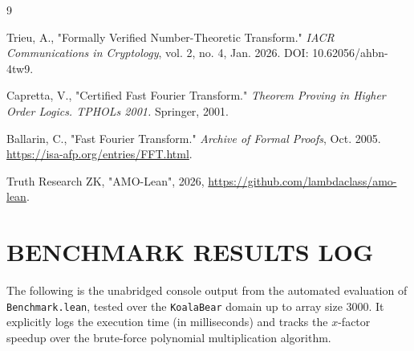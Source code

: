 \documentclass[a4paper,12pt]{report}
\begin{document}


\newpage

\renewcommand{\bibname}{REFERENCES} %
\begin{thebibliography}{9}

Trieu, A., "Formally Verified Number-Theoretic Transform." \textit{IACR Communications in Cryptology}, vol. 2, no. 4, Jan. 2026. DOI: 10.62056/ahbn-4tw9.

Capretta, V., "Certified Fast Fourier Transform." \textit{Theorem Proving in Higher Order Logics. TPHOLs 2001.} Springer, 2001.

Ballarin, C., "Fast Fourier Transform." \textit{Archive of Formal Proofs}, Oct. 2005. \url{https://isa-afp.org/entries/FFT.html}.

Truth Research ZK, "AMO-Lean", 2026, \url{https://github.com/lambdaclass/amo-lean}.

\end{thebibliography}
\newpage

\appendix
\chapter{BENCHMARK RESULTS LOG}
The following is the unabridged console output from the automated evaluation of \texttt{Benchmark.lean}, tested over the \texttt{KoalaBear} domain up to array size 3000. It explicitly logs the execution time (in milliseconds) and tracks the $x$-factor speedup over the brute-force polynomial multiplication algorithm.
\end{document}
